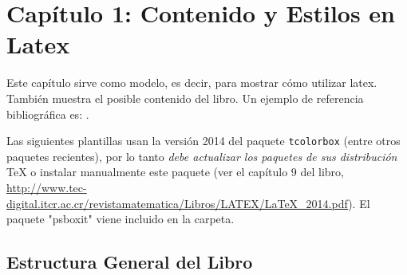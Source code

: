 \chapter{Capítulo 1: Contenido y Estilos en Latex}
Este capítulo sirve como modelo, es decir, para mostrar cómo utilizar latex. También muestra el posible contenido del libro. Un ejemplo de referencia bibliográfica es: \cite{kappel2006web}.


\begin{caja}[Advertencia.]
	Las siguientes plantillas usan la versión 2014 del paquete
	\verb+tcolorbox+ (entre otros paquetes recientes),  por lo tanto {\it debe actualizar los paquetes de sus distribución} \TeX{} o instalar manualmente este paquete (ver el capítulo 9 del libro, \url{http://www.tec-digital.itcr.ac.cr/revistamatematica/Libros/LATEX/LaTeX_2014.pdf}). El paquete "psboxit" viene incluido en la carpeta.
\end{caja}



\section{Estructura General del Libro}

